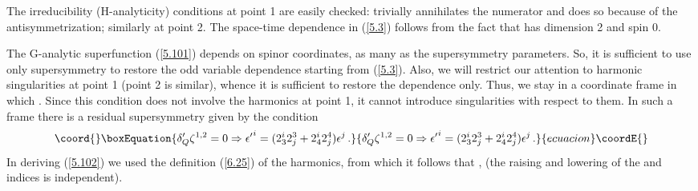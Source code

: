 \documentclass[a4paper,11pt]{article}
\begin{document}
The irreducibility (H-analyticity) conditions at point 1 are easily checked:
\coordHE{} trivially annihilates the numerator and \coordHE{}
does so because of the antisymmetrization; similarly at point 2. The space-time
dependence in (\ref{5.3}) follows from the fact that \coordHE{} has dimension 2 and
spin 0.

The G-analytic superfunction (\ref{5.101}) depends on \coordHE{} spinor coordinates,
as many as the \coordHE{} supersymmetry parameters. So, it is sufficient to use only
\coordHE{} supersymmetry to restore the odd variable dependence starting from
(\ref{5.3}). Also, we will restrict our attention to harmonic singularities at
point 1 (point 2 is similar), whence it is sufficient to restore the \myHighlight{$\theta$}\coordHE{}
dependence only. Thus, we stay in a coordinate frame in which \coordHE{}. Since
this condition does not involve the harmonics at point 1, it cannot introduce
singularities with respect to them. In such a frame there is a residual \coordHE{}
supersymmetry given by the condition
\begin{equation}\coord{}\boxEquation{
  \delta'_Q \zeta^{1,2} = 0 \Rightarrow {\epsilon'}^i =
  (2_3^i 2^3_j + 2_4^i 2^4_j) \epsilon^j
   \label{5.102} \, .
}{
  \delta'_Q \zeta^{1,2} = 0 \Rightarrow {\epsilon'}^i =
  (2_3^i 2^3_j + 2_4^i 2^4_j) \epsilon^j
   \, .
}{ecuacion}\coordE{}\end{equation}
In deriving (\ref{5.102}) we used the definition (\ref{6.25}) of
the harmonics, from which it follows that \coordHE{}, \coordHE{}
(the raising and lowering of the \coordHE{} and \coordHE{} indices is
independent).
\end{document}
